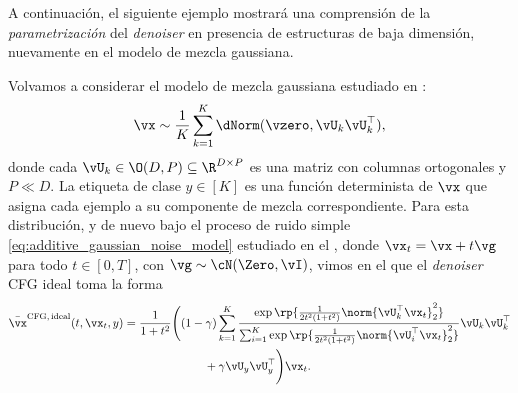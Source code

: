 \documentclass[../../book-main_es.tex]{subfiles}
\begin{document}
A continuación, el siguiente ejemplo mostrará una comprensión de la
\textit{parametrización} del \textit{denoiser} en presencia de
estructuras de baja dimensión, nuevamente en el modelo de mezcla gaussiana.

\begin{example}\label{example:denoising-gaussian-mixture-cfg-parameterization}
    Volvamos a considerar el modelo de mezcla gaussiana estudiado en
    :
    \begin{equation}
        \vx \sim \frac{1}{K}\sum_{k = 1}^{K}\dNorm(\vzero,
        \vU_{k}\vU_{k}^{\top}),
    \end{equation}
    donde cada \(\vU_{k} \in \O(D, P) \subseteq \R^{D \times P}\) es
    una matriz con
    columnas ortogonales y $P \ll D$.
    La etiqueta de clase $y \in [K]$ es una función determinista de $\vx$ que asigna cada
    ejemplo a su componente de mezcla correspondiente.
    Para esta distribución,
    y de nuevo bajo el proceso de ruido simple
    \eqref{eq:additive_gaussian_noise_model} estudiado en el ,
    donde   
    $\vx_t = \vx + t \vg$ para todo $t \in [0, T]$, con $\vg \sim \cN(\Zero,
    \vI)$,  
    vimos en el 
    que el \textit{denoiser} CFG ideal toma la forma
    \begin{equation}\label{eq:cfg-denoiser-mog-low-rank-3}
        \begin{split}
            \bar{\vx}^{\mathrm{CFG,\,ideal}}(t, \vx_t, y)
            =
            \frac{1}{1 + t^{2}}
            \Biggl(
                &(1 - \gamma)
                \sum_{k = 1}^{K}\frac{\exp\rp{\frac{1}{2t^{2}(1
                + t^{2})}\norm{\vU_{k}^{\top}\vx_t}_{2}^{2}}}{\sum_{i
                    = 1}^{K}\exp\rp{\frac{1}{2t^{2}(1
                                +
                t^{2})}\norm{\vU_{i}^{\top}\vx_t}_{2}^{2}}}\vU_{k}\vU_{k}^{\top}
                \\
                &\qquad+
                \gamma
                \vU_{y}\vU_{y}^{\top}
            \Biggr)
            \vx_t.
        \end{split}
    \end{equation}


\end{example}
\end{document}
